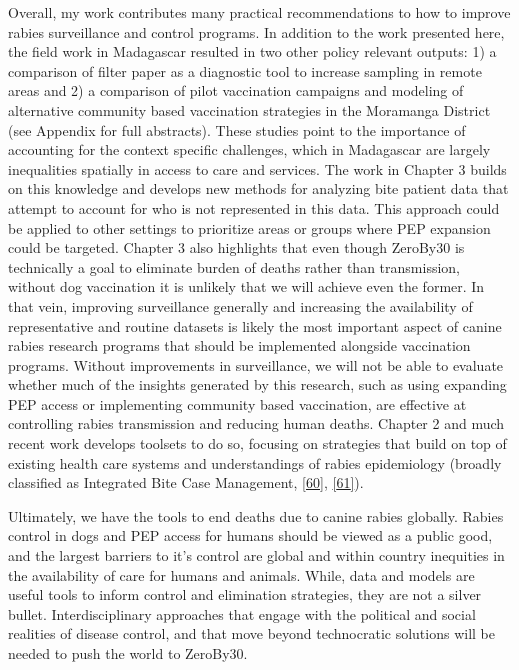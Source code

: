 \documentclass[
  oneside]{book}
\begin{document}
Overall, my work contributes many practical recommendations to how to improve rabies surveillance and control programs. In addition to the work presented here, the field work in Madagascar resulted in two other policy relevant outputs: 1) a comparison of filter paper as a diagnostic tool to increase sampling in remote areas and 2) a comparison of pilot vaccination campaigns and modeling of alternative community based vaccination strategies in the Moramanga District (see Appendix for full abstracts). These studies point to the importance of accounting for the context specific challenges, which in Madagascar are largely inequalities spatially in access to care and services. The work in Chapter 3 builds on this knowledge and develops new methods for analyzing bite patient data that attempt to account for who is not represented in this data. This approach could be applied to other settings to prioritize areas or groups where PEP expansion could be targeted. Chapter 3 also highlights that even though ZeroBy30 is technically a goal to eliminate burden of deaths rather than transmission, without dog vaccination it is unlikely that we will achieve even the former. In that vein, improving surveillance generally and increasing the availability of representative and routine datasets is likely the most important aspect of canine rabies research programs that should be implemented alongside vaccination programs. Without improvements in surveillance, we will not be able to evaluate whether much of the insights generated by this research, such as using expanding PEP access or implementing community based vaccination, are effective at controlling rabies transmission and reducing human deaths. Chapter 2 and much recent work develops toolsets to do so, focusing on strategies that build on top of existing health care systems and understandings of rabies epidemiology (broadly classified as Integrated Bite Case Management, \protect\hyperlink{ref-undurraga2017}{{[}60{]}}, \protect\hyperlink{ref-Lushasi2020}{{[}61{]}}).

Ultimately, we have the tools to end deaths due to canine rabies globally. Rabies control in dogs and PEP access for humans should be viewed as a public good, and the largest barriers to it's control are global and within country inequities in the availability of care for humans and animals. While, data and models are useful tools to inform control and elimination strategies, they are not a silver bullet. Interdisciplinary approaches that engage with the political and social realities of disease control, and that move beyond technocratic solutions will be needed to push the world to ZeroBy30.
\end{document}
